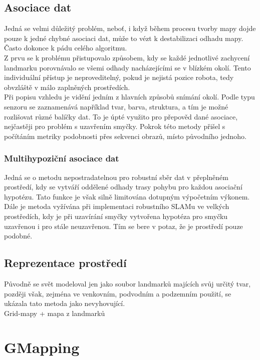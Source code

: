 \documentclass[11pt]{article}
\begin{document}
\subsection{Asociace dat}
Jedná se velmi důležitý problém, neboť, i když během procesu tvorby mapy dojde pouze k jedné chybné asociaci dat, může to vézt k destabilizaci odhadu mapy. Často dokonce k pádu celého algoritmu.\\
\indent Z prvu se k problému přistupovalo způsobem, kdy se každé jednotlivé zachycení landmarku porovnávalo se všemi odhady nacházejícími se v blízkém okolí. Tento individuální přístup je neproveditelný, pokud je nejistá pozice robota, tedy obvzláště v málo zaplněných prostředích. \\
\indent Při popisu vzhledu je vidění jedním z hlavních způsobů snímání okolí. Podle typu senzoru se zaznamenává například tvar, barva, struktura, a tím je možné rozlišovat různé balíčky dat. To je úpté využito pro přepověd dané asociace, nejčastěji pro problém s uzavřením smyčky. Pokrok této metody přišel s počítáním metriky podobnosti přes sekvenci obrazů, místo původního jednoho. 

\subsubsection{Multihypoziční asociace dat}
Jedná se o metodu nepostradatelnou pro robustní sběr dat v přeplněném prostředí, kdy se vytváří oddělené odhady trasy pohybu pro každou asociační hypotézu. Tato funkce je však silně limitována dotupným výpočetním výkonem. Dále je metoda vyžívána při implementaci robustního SLAMu ve velkých prostředích, kdy je při uzavírání smyčky vytvořena hypotéza pro smyčku uzavřenou i pro stále neuzavřenou. Tím se bere v potaz, že je prostředí pouze podobné. 


\subsection{Reprezentace prostředí}
Původně se svět modeloval jen jako soubor landmarků majících svůj určitý tvar, později však, zejména ve venkovním, podvodním a podzemním použití, se ukázala tato metoda jako nevyhovující.\\
Grid-mapy + mapa z landmarků



\newpage

\section{GMapping}
\end{document}
